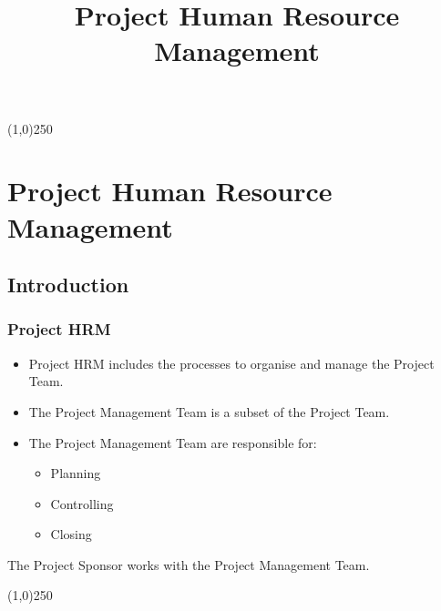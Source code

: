 



%
\title[Project Management]{Project Human Resource Management}



%
\usetikzlibrary{arrows}

\tableofcontents
\newpage



\begin{frame}
\titlepage
\end{frame}\begin{center}\line(1,0){250}\end{center}
%
%


\section{Project Human Resource Management}

\subsection{Introduction}



\begin{frame}
\frametitle{Project HRM}
\begin{itemize}
	\item Project HRM includes the processes to organise and manage the Project Team.
	\item The Project Management Team is a subset of the Project Team.
	\item The Project Management Team are responsible for:
		\begin{itemize}
			\item Planning
			\item Controlling
			\item Closing
		\end{itemize}
\end{itemize}
The Project Sponsor works with the Project Management Team.
\end{frame}\begin{center}\line(1,0){250}\end{center}
 
